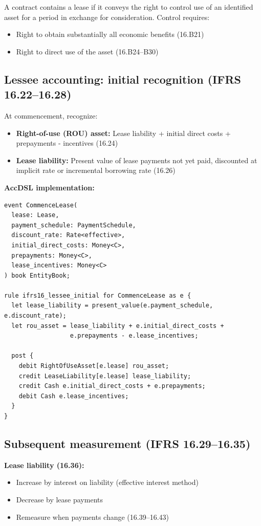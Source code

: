 A contract contains a lease if it conveys the right to control use of an identified
asset for a period in exchange for consideration. Control requires:
\begin{itemize}
\item Right to obtain substantially all economic benefits (16.B21)
\item Right to direct use of the asset (16.B24--B30)
\end{itemize}

\subsection{Lessee accounting: initial recognition (IFRS 16.22--16.28)}

At commencement, recognize:
\begin{itemize}
\item \textbf{Right-of-use (ROU) asset:} Lease liability + initial direct costs +
  prepayments - incentives (16.24)
\item \textbf{Lease liability:} Present value of lease payments not yet paid,
  discounted at implicit rate or incremental borrowing rate (16.26)
\end{itemize}

\textbf{AccDSL implementation:}

\begin{lstlisting}
event CommenceLease(
  lease: Lease,
  payment_schedule: PaymentSchedule,
  discount_rate: Rate<effective>,
  initial_direct_costs: Money<C>,
  prepayments: Money<C>,
  lease_incentives: Money<C>
) book EntityBook;

rule ifrs16_lessee_initial for CommenceLease as e {
  let lease_liability = present_value(e.payment_schedule, e.discount_rate);
  let rou_asset = lease_liability + e.initial_direct_costs +
                  e.prepayments - e.lease_incentives;

  post {
    debit RightOfUseAsset[e.lease] rou_asset;
    credit LeaseLiability[e.lease] lease_liability;
    credit Cash e.initial_direct_costs + e.prepayments;
    debit Cash e.lease_incentives;
  }
}
\end{lstlisting}

\subsection{Subsequent measurement (IFRS 16.29--16.35)}

\textbf{Lease liability (16.36):}
\begin{itemize}
\item Increase by interest on liability (effective interest method)
\item Decrease by lease payments
\item Remeasure when payments change (16.39--16.43)
\end{itemize}


